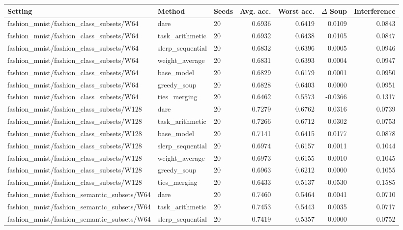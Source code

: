 \begin{tabular}{lllrrrr}
\toprule
Setting & Method & Seeds & Avg. acc. & Worst acc. & $\Delta$ Soup & Interference \\
\midrule
fashion\_mnist/fashion\_class\_subsets/W64 & dare & 20 & 0.6936 & 0.6419 & 0.0109 & 0.0843 \\
fashion\_mnist/fashion\_class\_subsets/W64 & task\_arithmetic & 20 & 0.6932 & 0.6438 & 0.0105 & 0.0847 \\
fashion\_mnist/fashion\_class\_subsets/W64 & slerp\_sequential & 20 & 0.6832 & 0.6396 & 0.0005 & 0.0946 \\
fashion\_mnist/fashion\_class\_subsets/W64 & weight\_average & 20 & 0.6831 & 0.6393 & 0.0004 & 0.0947 \\
fashion\_mnist/fashion\_class\_subsets/W64 & base\_model & 20 & 0.6829 & 0.6179 & 0.0001 & 0.0950 \\
fashion\_mnist/fashion\_class\_subsets/W64 & greedy\_soup & 20 & 0.6828 & 0.6403 & 0.0000 & 0.0951 \\
fashion\_mnist/fashion\_class\_subsets/W64 & ties\_merging & 20 & 0.6462 & 0.5573 & -0.0366 & 0.1317 \\
fashion\_mnist/fashion\_class\_subsets/W128 & dare & 20 & 0.7279 & 0.6762 & 0.0316 & 0.0739 \\
fashion\_mnist/fashion\_class\_subsets/W128 & task\_arithmetic & 20 & 0.7266 & 0.6712 & 0.0302 & 0.0753 \\
fashion\_mnist/fashion\_class\_subsets/W128 & base\_model & 20 & 0.7141 & 0.6415 & 0.0177 & 0.0878 \\
fashion\_mnist/fashion\_class\_subsets/W128 & slerp\_sequential & 20 & 0.6974 & 0.6157 & 0.0011 & 0.1044 \\
fashion\_mnist/fashion\_class\_subsets/W128 & weight\_average & 20 & 0.6973 & 0.6155 & 0.0010 & 0.1045 \\
fashion\_mnist/fashion\_class\_subsets/W128 & greedy\_soup & 20 & 0.6963 & 0.6212 & 0.0000 & 0.1055 \\
fashion\_mnist/fashion\_class\_subsets/W128 & ties\_merging & 20 & 0.6433 & 0.5137 & -0.0530 & 0.1585 \\
fashion\_mnist/fashion\_semantic\_subsets/W64 & dare & 20 & 0.7460 & 0.5464 & 0.0041 & 0.0710 \\
fashion\_mnist/fashion\_semantic\_subsets/W64 & task\_arithmetic & 20 & 0.7453 & 0.5443 & 0.0035 & 0.0717 \\
fashion\_mnist/fashion\_semantic\_subsets/W64 & slerp\_sequential & 20 & 0.7419 & 0.5357 & 0.0000 & 0.0752 \\

\end{tabular}
